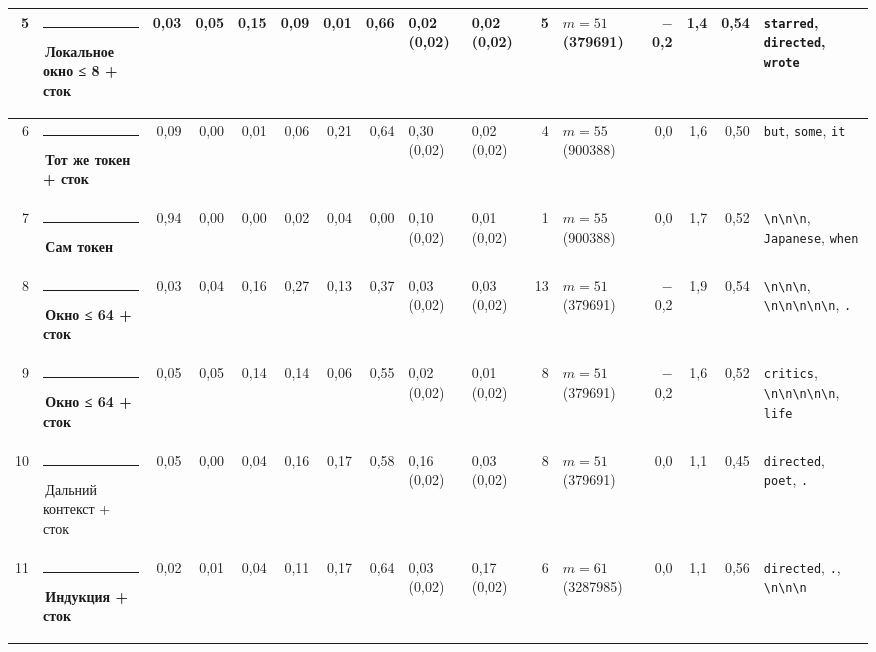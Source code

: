 \documentclass[10pt]{article}
\begin{document}
\begin{minipage}{\linewidth}
\begin{center}
{\begin{tabular}{|r|l|r|r|r|r|r|r|l|l|r|l|r|r|r|l|}
5 & \textcolor[HTML]{1BAF7A}{\rule{0.62em}{0.62em}}\,\textbf{Локальное окно ≤ 8 + сток} & 0,03 & 0,05 & 0,15 & 0,09 & 0,01 & 0,66 & 0,02 (0,02) & 0,02 (0,02) & 5 & $m{=}51$ (379691) & $-$0,2 & 1,4 & 0,54 & \texttt{\textvisiblespace{}starred}, \texttt{\textvisiblespace{}directed}, \texttt{\textvisiblespace{}wrote} \\ \hline
6 & \textcolor[HTML]{E87BA4}{\rule{0.62em}{0.62em}}\,\textbf{Тот же токен + сток} & 0,09 & 0,00 & 0,01 & 0,06 & 0,21 & 0,64 & 0,30 (0,02) & 0,02 (0,02) & 4 & $m{=}55$ (900388) & 0,0 & 1,6 & 0,50 & \texttt{\textvisiblespace{}but}, \texttt{\textvisiblespace{}some}, \texttt{\textvisiblespace{}it} \\ \hline
7 & \textcolor[HTML]{2A78D6}{\rule{0.62em}{0.62em}}\,\textbf{Сам токен} & 0,94 & 0,00 & 0,00 & 0,02 & 0,04 & 0,00 & 0,10 (0,02) & 0,01 (0,02) & 1 & $m{=}55$ (900388) & 0,0 & 1,7 & 0,52 & \texttt{\textvisiblespace{}\textbackslash{}n\textbackslash{}n\textbackslash{}n}, \texttt{\textvisiblespace{}Japanese}, \texttt{\textvisiblespace{}when} \\ \hline
8 & \textcolor[HTML]{EDA100}{\rule{0.62em}{0.62em}}\,\textbf{Окно ≤ 64 + сток} & 0,03 & 0,04 & 0,16 & 0,27 & 0,13 & 0,37 & 0,03 (0,02) & 0,03 (0,02) & 13 & $m{=}51$ (379691) & $-$0,2 & 1,9 & 0,54 & \texttt{\textvisiblespace{}\textbackslash{}n\textbackslash{}n\textbackslash{}n}, \texttt{\textvisiblespace{}\textbackslash{}n\textbackslash{}n\textbackslash{}n\textbackslash{}n\textbackslash{}n}, \texttt{\textvisiblespace{}.} \\ \hline
9 & \textcolor[HTML]{EDA100}{\rule{0.62em}{0.62em}}\,\textbf{Окно ≤ 64 + сток} & 0,05 & 0,05 & 0,14 & 0,14 & 0,06 & 0,55 & 0,02 (0,02) & 0,01 (0,02) & 8 & $m{=}51$ (379691) & $-$0,2 & 1,6 & 0,52 & \texttt{\textvisiblespace{}critics}, \texttt{\textvisiblespace{}\textbackslash{}n\textbackslash{}n\textbackslash{}n\textbackslash{}n\textbackslash{}n}, \texttt{\textvisiblespace{}life} \\ \hline
10 & \textcolor[HTML]{C3C2B7}{\rule{0.62em}{0.62em}}\,Дальний контекст + сток & 0,05 & 0,00 & 0,04 & 0,16 & 0,17 & 0,58 & 0,16 (0,02) & 0,03 (0,02) & 8 & $m{=}51$ (379691) & 0,0 & 1,1 & 0,45 & \texttt{\textvisiblespace{}directed}, \texttt{\textvisiblespace{}poet}, \texttt{\textvisiblespace{}.} \\ \hline
11 & \textcolor[HTML]{008300}{\rule{0.62em}{0.62em}}\,\textbf{Индукция + сток} & 0,02 & 0,01 & 0,04 & 0,11 & 0,17 & 0,64 & 0,03 (0,02) & 0,17 (0,02) & 6 & $m{=}61$ (3287985) & 0,0 & 1,1 & 0,56 & \texttt{\textvisiblespace{}directed}, \texttt{\textvisiblespace{}.}, \texttt{\textvisiblespace{}\textbackslash{}n\textbackslash{}n\textbackslash{}n} \\ \hline

\end{tabular}}
\end{center}
\end{minipage}
\end{document}
